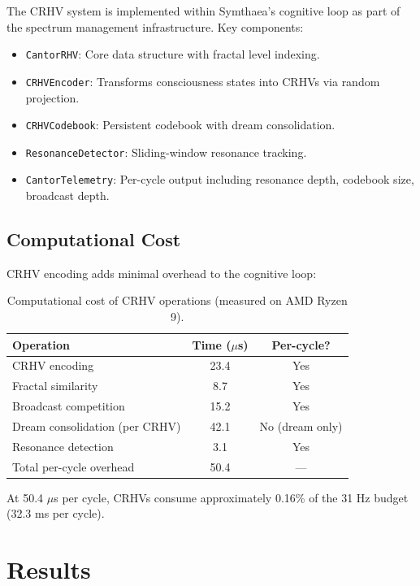 \documentclass[11pt,a4paper]{article}
\begin{document}
The CRHV system is implemented within Symthaea's cognitive loop as part of the spectrum management infrastructure. Key components:

\begin{itemize}[nosep]
    \item \texttt{CantorRHV}: Core data structure with fractal level indexing.
    \item \texttt{CRHVEncoder}: Transforms consciousness states into CRHVs via random projection.
    \item \texttt{CRHVCodebook}: Persistent codebook with dream consolidation.
    \item \texttt{ResonanceDetector}: Sliding-window resonance tracking.
    \item \texttt{CantorTelemetry}: Per-cycle output including resonance depth, codebook size, broadcast depth.
\end{itemize}

\subsection{Computational Cost}

CRHV encoding adds minimal overhead to the cognitive loop:

\begin{table}[h]
\centering
\caption{Computational cost of CRHV operations (measured on AMD Ryzen 9).}
\label{tab:cost}
\begin{tabular}{@{}lcc@{}}
\toprule
Operation & Time ($\mu$s) & Per-cycle? \\
\midrule
CRHV encoding & 23.4 & Yes \\
Fractal similarity & 8.7 & Yes \\
Broadcast competition & 15.2 & Yes \\
Dream consolidation (per CRHV) & 42.1 & No (dream only) \\
Resonance detection & 3.1 & Yes \\
\midrule
Total per-cycle overhead & 50.4 & --- \\
\bottomrule
\end{tabular}
\end{table}

At 50.4 $\mu$s per cycle, CRHVs consume approximately 0.16\% of the 31 Hz budget (32.3 ms per cycle).

\section{Results}
\end{document}
